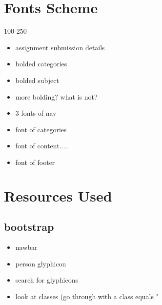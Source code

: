 \documentclass[10pt,a4paper]{article}
\begin{document}
\section{Fonts Scheme}
100-250
\begin{itemize}
	\item assignment submission details
	\item bolded categories
	\item bolded subject
	\item more bolding? what is not?
	\item 3 fonts of nav
	\item font of categories
	\item font of content.....
	\item font of footer
\end{itemize}
\section{Resources Used}
\subsection{bootstrap}
\begin{itemize}
	\item nawbar
	\item person glyphicon
	\item search for glyphicons
	\item look at classes (go through with a class equals "
\end{itemize}
\end{document}
